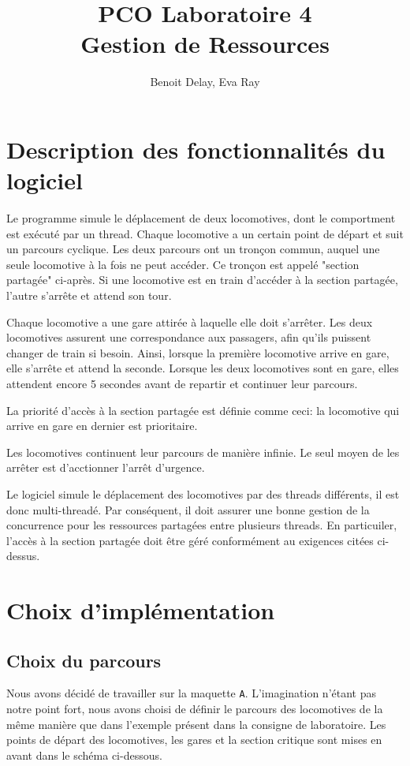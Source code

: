 \documentclass{article}
\title{PCO Laboratoire 4 \\
\large Gestion de Ressources}
\author{Benoit Delay, Eva Ray}
\begin{document}
\maketitle

\section*{Description des fonctionnalités du logiciel}

Le programme simule le déplacement de deux locomotives, dont le comportment est exécuté par un thread. 
Chaque locomotive a un certain point de départ et suit un parcours cyclique. Les deux
parcours ont un tronçon commun, auquel une seule locomotive à la fois ne peut accéder. Ce tronçon est appelé "section partagée" ci-après. Si une
locomotive est en train d'accéder à la section partagée, l'autre s'arrête et attend son tour. 

\noindent
Chaque locomotive a une gare attirée à laquelle elle doit s'arrêter. Les deux locomotives assurent une correspondance aux passagers, 
afin qu'ils puissent changer de train si besoin. Ainsi, lorsque la première locomotive arrive en gare, elle s'arrête et attend la seconde. 
Lorsque les deux locomotives sont en gare, elles attendent encore 5 secondes avant de repartir et continuer leur parcours. 

\noindent
La priorité d'accès à la section partagée est définie comme ceci: la locomotive qui arrive en gare en dernier est prioritaire. 

\noindent
Les locomotives continuent leur parcours de manière infinie. Le seul moyen de les arrêter est d'acctionner l'arrêt d'urgence. 

\noindent
Le logiciel simule le déplacement des locomotives par des threads différents, il est donc multi-threadé. Par conséquent, il doit 
assurer une bonne gestion de la concurrence pour les ressources partagées entre plusieurs threads. En particuiler, l'accès à la section
partagée doit être géré conformément au exigences citées ci-dessus. 

\section*{Choix d'implémentation}
\subsection*{Choix du parcours}
Nous avons décidé de travailler sur la maquette \texttt{A}. L'imagination n'étant pas notre point fort, nous avons choisi de définir le parcours des
locomotives de la même manière que dans l'exemple présent dans la consigne de laboratoire. Les points de départ des locomotives, les gares et la
section critique sont mises en avant dans le schéma ci-dessous. 
\end{document}
